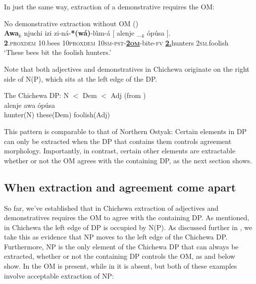 \documentclass[output=paper,colorlinks,citecolor=brown]{langscibook}
\begin{document}
In just the same way, extraction of a demonstrative requires the OM:

\ea%
    \label{ex:branan:7}
    No demonstrative extraction without OM \hfill{(\citealt[ex. 2b-c]{Mchombo2006})}\\
    \gll    \textbf{Awa}$_{k}$ njuchi izi zi-n\'{a}-\textbf{*(w\'{a})}-l\^{u}m-\'{a} [ alenje \_$_{k}$ \'{o}p\'{u}sa  ]. \\
            \textbf{2}.\textsc{proxdem} 10.bees 10\textsc{proxdem} 10\textsc{sm-pst}-\underline{\textbf{2\textsc{om}}}-bite-\textsc{fv} {} \underline{\textbf{2.}}hunters {} 2\textsc{sm}.foolish {} \\
    \glt    `These bees bit the foolish hunters.'
\z

Note that both adjectives and demonstratives in Chichewa originate on the right side of N(P), which sits at the left edge of the DP.

\ea%
    \label{ex:branan:8}
    The Chichewa DP: N $<$ Dem $<$ Adj  \hfill{(from \citealt[ex. 2a]{Mchombo2006})}\\
    \gll    alenje awa \'{o}p\'{u}sa \\
            hunter(N) these(Dem) foolish(Adj) \\
\z

This pattern is comparable to that of Northern Ostyak: Certain elements in DP can only be extracted when the DP that contains them controls agreement morphology. Importantly, in contrast, certain other elements are extractable whether or not the OM agrees with the containing DP, as the next section shows.

\subsection{When extraction and agreement come apart}\label{sec:branan:3.2}

So far, we've established that in Chichewa extraction of adjectives and demonstratives requires the OM to agree with the containing DP. As mentioned, in Chichewa the left edge of DP is occupied by N(P). As discussed further in , we take this as evidence that NP moves to the left edge of the Chichewa DP. Furthermore, NP is the only element of the Chichewa DP that can always be extracted, whether or not the containing DP controls the OM, as  and  below show. In  the OM is present, while in  it is absent, but both of these examples involve acceptable extraction of NP:
\end{document}
